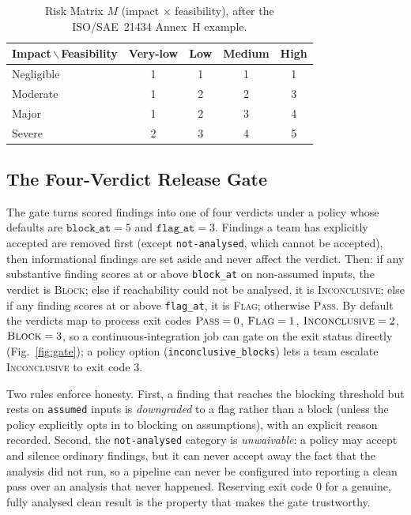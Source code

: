 \documentclass[journal]{IEEEtran}
\begin{document}
\begin{table}[t]
\centering
\caption{Risk Matrix $M$ (impact $\times$ feasibility), after the ISO/SAE~21434 Annex~H example.}
\label{tab:riskmatrix}
\renewcommand{\arraystretch}{1.25}
\begin{tabular}{@{}l cccc@{}}
\toprule
\textbf{Impact}\,$\backslash$\,\textbf{Feasibility} & \textbf{Very-low} & \textbf{Low} & \textbf{Medium} & \textbf{High} \\
\midrule
Negligible & 1 & 1 & 1 & 1 \\
Moderate   & 1 & 2 & 2 & 3 \\
Major      & 1 & 2 & 3 & 4 \\
Severe     & 2 & 3 & 4 & 5 \\
\bottomrule
\end{tabular}
\end{table}

\subsection{The Four-Verdict Release Gate}
\label{subsec:gate}
The gate turns scored findings into one of four verdicts under a policy whose
defaults are $\texttt{block\_at}=5$ and $\texttt{flag\_at}=3$. Findings a team
has explicitly accepted are removed first (except \texttt{not-analysed}, which
cannot be accepted), then informational findings are set aside and never affect
the verdict. Then: if any substantive finding scores at or above
\texttt{block\_at} on non-assumed inputs, the verdict is \textsc{Block}; else if
reachability could not be analysed, it is \textsc{Inconclusive}; else if any
finding scores at or above \texttt{flag\_at}, it is \textsc{Flag}; otherwise
\textsc{Pass}. By default the verdicts map to process exit codes
$\textsc{Pass}=0$, $\textsc{Flag}=1$, $\textsc{Inconclusive}=2$,
$\textsc{Block}=3$, so a continuous-integration job can gate on the exit status
directly (Fig.~\ref{fig:gate}); a policy option (\texttt{inconclusive\_blocks})
lets a team escalate \textsc{Inconclusive} to exit code $3$.

Two rules enforce honesty. First, a finding that reaches the blocking threshold
but rests on \texttt{assumed} inputs is \emph{downgraded} to a flag rather than
a block (unless the policy explicitly opts in to blocking on assumptions), with
an explicit reason recorded. Second, the \texttt{not-analysed} category is
\emph{unwaivable}: a policy may accept and silence ordinary findings, but it can
never accept away the fact that the analysis did not run, so a pipeline can
never be configured into reporting a clean pass over an analysis that never
happened. Reserving exit code $0$ for a genuine, fully analysed clean result is
the property that makes the gate trustworthy.
\end{document}
